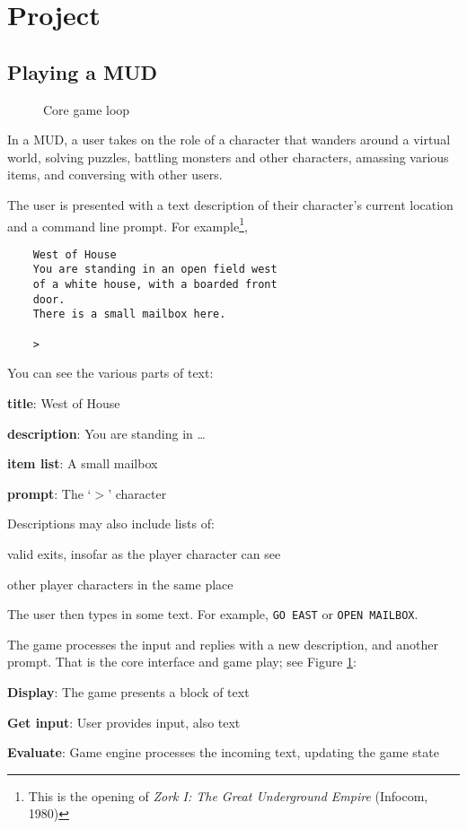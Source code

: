 \documentclass{article}
\newcommand{\enterProblemHeader}[1]{
}
\newcommand{\exitProblemHeader}[1]{
\nobreak\extramarks{#1}{}\nobreak
}
\newcounter{homeworkProblemCounter} %
\newcommand{\homeworkProblemName}{}
\newenvironment{homeworkProblem}[1][Problem \arabic{homeworkProblemCounter}]{ %
\stepcounter{homeworkProblemCounter} %
\renewcommand{\homeworkProblemName}{#1} %
\section{\homeworkProblemName} %
\enterProblemHeader{\homeworkProblemName} %
}{
\exitProblemHeader{\homeworkProblemName} %
}
\newcommand{\homeworkSectionName}{}
\newenvironment{homeworkSection}[1]{ %
\renewcommand{\homeworkSectionName}{#1} %
\subsection{\homeworkSectionName} %
\enterProblemHeader{\homeworkProblemName\ [\homeworkSectionName]} %
}{
\enterProblemHeader{\homeworkProblemName} %
}
\begin{document}
\begin{homeworkProblem}[Project]
\begin{homeworkSection}{Playing a MUD}
\begin{figure}
		\caption{Core game loop}
		\label{fig:gameplay}
		\end{figure}

	In a MUD, a user takes on the role of a character that wanders around a virtual world, solving puzzles, battling monsters and other characters, amassing various items, and conversing with other users.
	
	The user is presented with a text description of their character's current location and a command line prompt. For example\footnote{This is the opening of \textit{Zork I: The Great Underground Empire} (Infocom, 1980)},

	\begin{verbatim}
    West of House
    You are standing in an open field west
    of a white house, with a boarded front
    door.
    There is a small mailbox here.

    >
	\end{verbatim}

	You can see the various parts of text:
	\begin{compactitem}
		\item \textbf{title}: West of House
		\item \textbf{description}: You are standing in \dots
		\item \textbf{item list}: A small mailbox
		\item \textbf{prompt}: The `$>$' character
	\end{compactitem}

	Descriptions may also include lists of:

	\begin{compactitem}
		\item valid exits, insofar as the player character can see
		\item other player characters in the same place
	\end{compactitem}
	
	The user then types in some text. For example, \texttt{GO EAST} or \texttt{OPEN MAILBOX}.

	The game processes the input and replies with a new description, and another prompt. That is the core interface and game play; see Figure \ref{fig:gameplay}:

	\begin{compactitem}
		\item \textbf{Display}: The game presents a block of text
		\item \textbf{Get input}: User provides input, also text
		\item \textbf{Evaluate}: Game engine processes the incoming text, updating the game state
	\end{compactitem}
\end{homeworkSection}


\end{homeworkProblem}
\end{document}
